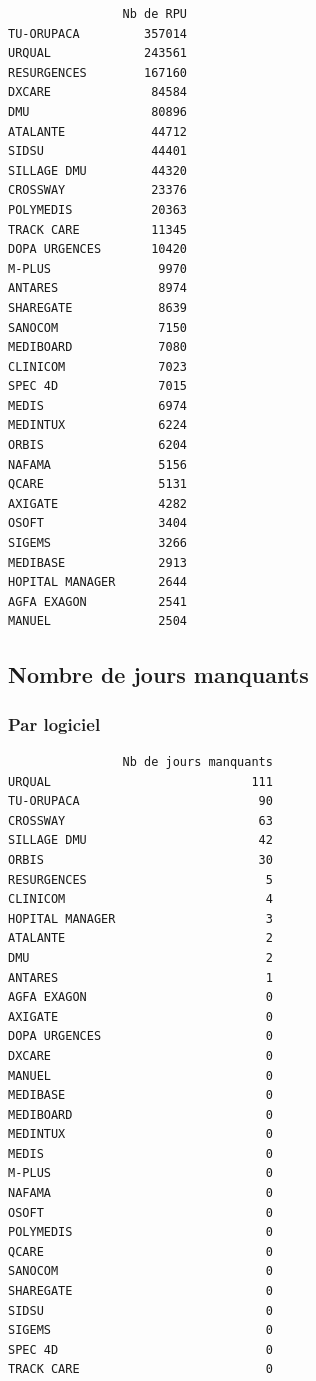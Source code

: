 \documentclass[]{article}
\begin{document}
\begin{verbatim}
                Nb de RPU
TU-ORUPACA         357014
URQUAL             243561
RESURGENCES        167160
DXCARE              84584
DMU                 80896
ATALANTE            44712
SIDSU               44401
SILLAGE DMU         44320
CROSSWAY            23376
POLYMEDIS           20363
TRACK CARE          11345
DOPA URGENCES       10420
M-PLUS               9970
ANTARES              8974
SHAREGATE            8639
SANOCOM              7150
MEDIBOARD            7080
CLINICOM             7023
SPEC 4D              7015
MEDIS                6974
MEDINTUX             6224
ORBIS                6204
NAFAMA               5156
QCARE                5131
AXIGATE              4282
OSOFT                3404
SIGEMS               3266
MEDIBASE             2913
HOPITAL MANAGER      2644
AGFA EXAGON          2541
MANUEL               2504
\end{verbatim}

\subsection{Nombre de jours manquants}\label{nombre-de-jours-manquants}

\subsubsection{Par logiciel}\label{par-logiciel}

\begin{verbatim}
                Nb de jours manquants
URQUAL                            111
TU-ORUPACA                         90
CROSSWAY                           63
SILLAGE DMU                        42
ORBIS                              30
RESURGENCES                         5
CLINICOM                            4
HOPITAL MANAGER                     3
ATALANTE                            2
DMU                                 2
ANTARES                             1
AGFA EXAGON                         0
AXIGATE                             0
DOPA URGENCES                       0
DXCARE                              0
MANUEL                              0
MEDIBASE                            0
MEDIBOARD                           0
MEDINTUX                            0
MEDIS                               0
M-PLUS                              0
NAFAMA                              0
OSOFT                               0
POLYMEDIS                           0
QCARE                               0
SANOCOM                             0
SHAREGATE                           0
SIDSU                               0
SIGEMS                              0
SPEC 4D                             0
TRACK CARE                          0
\end{verbatim}
\end{document}
